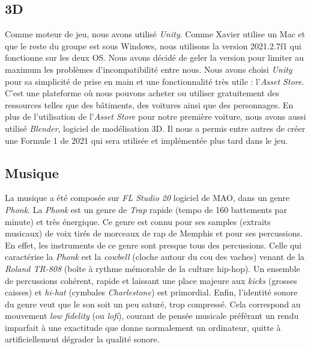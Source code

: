 \documentclass[12pt,a4paper]{article}
\begin{document}
    \subsection{3D}
        Comme moteur de jeu, nous avons utilisé \textsl{Unity}. Comme Xavier utilise un Mac 
        et que le reste du groupe est sous Windows, nous utilisons la version 2021.2.7f1 qui
        fonctionne sur les deux OS. Nous avons décidé de geler la version pour limiter au
        maximum les problèmes d'incompatibilité entre nous. Nous avons choisi \textsl{Unity}
        pour sa simplicité de prise en main et une fonctionnalité très utile :
        l'\textsl{Asset Store}. C'est une plateforme où nous pouvons acheter ou
        utiliser gratuitement des ressources telles que des bâtiments, des voitures ainsi que
        des personnages. En plus de l'utilisation de l'\textsl{Asset Store} pour notre première
        voiture, nous avons aussi utilisé \textsl{Blender}, logiciel de modélisation 3D. Il
        nous a permis entre autres de créer une Formule 1 de 2021 qui sera utilisée et
        implémentée plus tard dans le jeu.
    
    \subsection{Musique}
        La musique a été composée sur \textsl{FL Studio 20} logiciel de MAO, dans un genre 
        \textsl{Phonk}.
        La \textsl{Phonk} est un genre de \textit{Trap} rapide (tempo de 160 battements par minute) et très 
        énergique. Ce genre est connu pour ses samples (extraits musicaux) de voix tirés de 
        morceaux de rap de Memphis et pour ses percussions. En effet, les instruments de ce 
        genre sont presque tous des percussions. Celle qui caractérise la \textsl{Phonk} est la
        \textit{cowbell} (cloche autour du cou des vaches) venant de la \textit{Roland TR-808}
        (boîte à rythme mémorable de la culture hip-hop). Un ensemble de percussions cohérent, 
        rapide et laissant une place majeure aux \textit{kicks} (grosses caisses) et \textit{hi-hat}
        (cymbales \textit{Charlestone}) est primordial. Enfin, l'identité sonore du genre
        veut que le son soit un peu saturé, trop compressé. Cela correspond au mouvement
        \textit{low fidelity} (ou \textit{lofi}), courant de pensée musicale préférant un
        rendu imparfait à une exactitude que donne normalement un ordinateur, quitte à
        artificiellement dégrader la qualité sonore.\\
        
\end{document}
